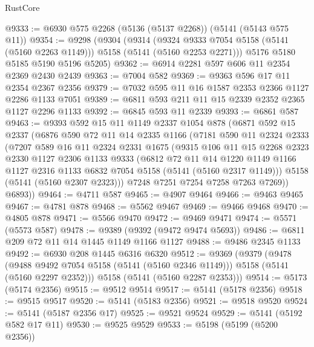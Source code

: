 \begin{lexlean}{RustCore}
\begin{coremodule}
@9333 := @6930 @575 @2268 (@5136 (@5137 @2268)) (@5141 (@5143 @575 @11))
@9354 := @9298
    (@9304
      (@9314
        (@9324 @9333 @7054 @5158 (@5141 (@5160 @2263 @1149)))
        @5158
        (@5141 (@5160 @2253 @2271)))
      @5176
      @5180
      @5185
      @5190
      @5196
      @5205)
@9362 := @6914 @2281 @597 @606 @11 @2354 @2369 @2430 @2439
@9363 := @7004 @582
@9369 := @9363 @596 @17 @11 @2354 @2367 @2356
@9379 := @7032 @595 @11 @16 @1587 @2353 @2366 @1127 @2286 @1133 @7051
@9389 := @6811 @593 @211 @11 @15 @2339 @2352 @2365 @1127 @2296 @1133
@9392 := @6845 @593 @11 @2339
@9393 := @6861 @587
@9463 := @9393
    @592
    @15
    @11
    @1149
    @2337
    @1054
    @878
    (@6871
      @592
      @15
      @2337
      (@6876
        @590
        @72
        @11
        @14
        @2335
        @1166
        (@7181
          @590
          @11
          @2324
          @2333
          (@7207
            @589
            @16
            @11
            @2324
            @2331
            @1675
            (@9315
              @106
              @11
              @15
              @2268
              @2323
              @2330
              @1127
              @2306
              @1133
              @9333
              (@6812
                @72
                @11
                @14
                @1220
                @1149
                @1166
                @1127
                @2316
                @1133
                @6832
                @7054
                @5158
                (@5141 (@5160 @2317 @1149)))
              @5158
              (@5141 (@5160 @2307 @2323)))
            @7248
            @7251
            @7254
            @7258
            @7263
            @7269))
        @6893))
@9464 := @4711 @587
@9465 := @4907 @9464
@9466 := @9463 @9465
@9467 := @4781 @878
@9468 := @5562 @9467
@9469 := @9466 @9468
@9470 := @4805 @878
@9471 := @5566 @9470
@9472 := @9469 @9471
@9474 := @5571 (@5573 @587)
@9478 := @9389 (@9392 (@9472 @9474 @5693))
@9486 := @6811 @209 @72 @11 @14 @1445 @1149 @1166 @1127
@9488 := @9486 @2345 @1133
@9492 := @6930 @208 @1445 @6316 @6320
@9512 := @9369
    (@9379
      (@9478
        (@9488 @9492 @7054 @5158 (@5141 (@5160 @2346 @1149)))
        @5158
        (@5141 (@5160 @2297 @2352)))
      @5158
      (@5141 (@5160 @2287 @2353)))
@9514 := @5173 (@5174 @2356)
@9515 := @9512 @9514
@9517 := @5141 (@5178 @2356)
@9518 := @9515 @9517
@9520 := @5141 (@5183 @2356)
@9521 := @9518 @9520
@9524 := @5141 (@5187 @2356 @17)
@9525 := @9521 @9524
@9529 := @5141 (@5192 @582 @17 @11)
@9530 := @9525 @9529
@9533 := @5198 (@5199 (@5200 @2356))

\end{coremodule}
\end{lexlean}

